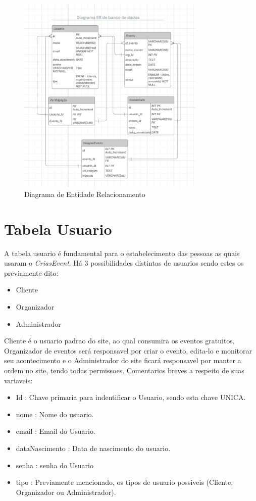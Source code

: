 \begin{figure}[h]
  \centering
  \includegraphics[width=0.8\textwidth]{images/diagrama_ER.png}
  \caption{Diagrama de Entidade Relacionamento}
  \label{fig:diagram_Entity_Relatioship}
\end{figure}

\section{Tabela Usuario}
A tabela usuario é fundamental para o estabelecimento das pessoas as quais usaram o \textit{CriasEvent}. Há 3 possibilidades distintas de usuarios sendo estes os previamente dito:
\begin{itemize}
    \item Cliente
    \item Organizador
    \item Administrador
\end{itemize}
Cliente é o usuario padrao do site, ao qual consumira os eventos gratuitos, Organizador de eventos será responsavel por criar o evento, edita-lo e monitorar seu acontecimento e o Administrador do site ficará responsavel por manter a ordem no site, tendo todas permissoes.
Comentarios breves a respeito de suas variaveis:
\begin{itemize}
    \item Id : Chave primaria para indentificar o Usuario, sendo esta chave UNICA.
    \item nome : Nome do usuario.
    \item email : Email do Usuario.
    \item dataNascimento : Data de nascimento do usuario.
    \item senha : senha do Usuario
    \item tipo : Previamente mencionado, os tipos de usuario possiveis (Cliente, Organizador ou Administrador).
\end{itemize}

